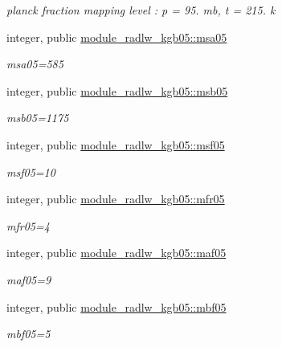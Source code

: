\begin{DoxyCompactItemize}
\begin{DoxyCompactList}\small\item\em planck fraction mapping level \+: p = 95. mb, t = 215. k \end{DoxyCompactList}\item 
\mbox{\label{namespacemodule__radlw__kgb05_a79c5177c6d0e56a69f4d1a0704879539}} 
integer, public \hyperlink{namespacemodule__radlw__kgb05_a79c5177c6d0e56a69f4d1a0704879539}{module\+\_\+radlw\+\_\+kgb05\+::msa05}
\begin{DoxyCompactList}\small\item\em msa05=585 \end{DoxyCompactList}\item 
integer, public \hyperlink{group__module__radlw__kgbnn_ga0f3b6573bfe94c5a5968cda2dc8b1adf}{module\+\_\+radlw\+\_\+kgb05\+::msb05}
\begin{DoxyCompactList}\small\item\em msb05=1175 \end{DoxyCompactList}\item 
integer, public \hyperlink{group__module__radlw__kgbnn_ga1c9a43b7011e7328fa62d3ecd29acc73}{module\+\_\+radlw\+\_\+kgb05\+::msf05}
\begin{DoxyCompactList}\small\item\em msf05=10 \end{DoxyCompactList}\item 
integer, public \hyperlink{group__module__radlw__kgbnn_ga44f07da9a7f99377f7d331249c475b80}{module\+\_\+radlw\+\_\+kgb05\+::mfr05}
\begin{DoxyCompactList}\small\item\em mfr05=4 \end{DoxyCompactList}\item 
integer, public \hyperlink{group__module__radlw__kgbnn_gaba904215976d7f4316b52c8f0cffe595}{module\+\_\+radlw\+\_\+kgb05\+::maf05}
\begin{DoxyCompactList}\small\item\em maf05=9 \end{DoxyCompactList}\item 
integer, public \hyperlink{group__module__radlw__kgbnn_ga57db9a9cb9acac604df555038f6127a3}{module\+\_\+radlw\+\_\+kgb05\+::mbf05}
\begin{DoxyCompactList}\small\item\em mbf05=5 \end{DoxyCompactList}\item 

\end{DoxyCompactItemize}
